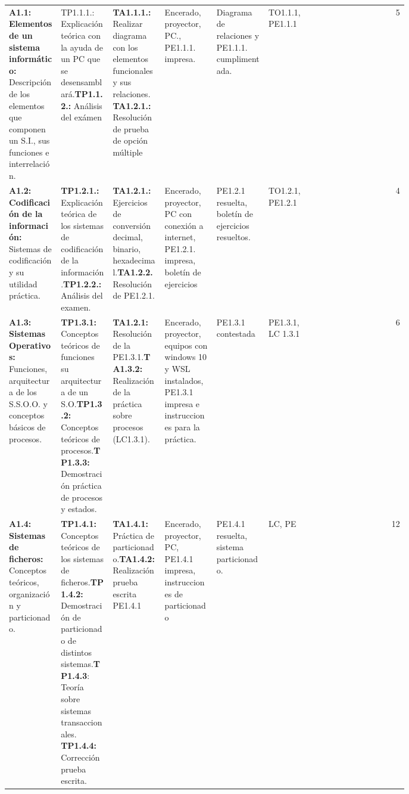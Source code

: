 \begin{landscape}
\begin{tabularx}{\linewidth}{p{0.13\linewidth} p{0.13\linewidth} p{0.13\linewidth} p{0.13\linewidth} p{0.13\linewidth} p{0.13\linewidth} r}
        \textbf{A1.1: Elementos de un sistema informático:} Descripción de los elementos que componen un S.I., sus funciones e interrelación. & TP1.1.1.: Explicación teórica con la ayuda de un PC que se desensamblará.\newline \textbf{TP1.1.2.:} Análisis del exámen & \textbf{TA1.1.1.:} Realizar diagrama con los elementos funcionales y sus relaciones.\newline \textbf{TA1.2.1.:} Resolución de prueba de opción múltiple & Encerado, proyector, PC., PE1.1.1. impresa. & Diagrama de relaciones y PE1.1.1. cumplimentada. & TO1.1.1, PE1.1.1 & 5 \\
        \textbf{A1.2: Codificación de la información:} Sistemas de codificación y su utilidad práctica. & \textbf{TP1.2.1.:} Explicación teórica de los sistemas de codificación de la información.\newline \textbf{TP1.2.2.:} Análisis del examen. & \textbf{TA1.2.1.:} Ejercicios de conversión decimal, binario, hexadecimal.\newline \textbf{TA1.2.2.} Resolución de PE1.2.1.& Encerado, proyector, PC con conexión a internet, PE1.2.1. impresa, boletín de ejercicios & PE1.2.1 resuelta, boletín de ejercicios resueltos. & TO1.2.1, PE1.2.1 & 4 \\
        \textbf{A1.3: Sistemas Operativos:} Funciones, arquitectura de los S.S.O.O. y conceptos básicos de procesos. & \textbf{TP1.3.1:} Conceptos teóricos de funciones su arquitectura de un S.O.\newline \textbf{TP1.3.2:} Conceptos teóricos de procesos.\newline \textbf{TP1.3.3:} Demostración práctica de procesos y estados. & \textbf{TA1.2.1:} Resolución de la PE1.3.1.\newline \textbf{TA1.3.2:} Realización de la práctica sobre procesos (LC1.3.1). & Encerado, proyector, equipos con windows 10 y WSL instalados, PE1.3.1 impresa e instrucciones para la práctica. & PE1.3.1 contestada & PE1.3.1, LC 1.3.1 & 6 \\
        \textbf{A1.4: Sistemas de ficheros:} Conceptos teóricos, organización y particionado. & \textbf{TP1.4.1:} Conceptos teóricos de los sistemas de ficheros.\newline \textbf{TP1.4.2:} Demostración de particionado de distintos sistemas.\newline \textbf{TP1.4.3}: Teoría sobre sistemas transaccionales. \newline \textbf{TP1.4.4:} Corrección prueba escrita. & \textbf{TA1.4.1:} Práctica de particionado.\newline \textbf{TA1.4.2:} Realización prueba escrita PE1.4.1 & Encerado, proyector, PC, PE1.4.1 impresa, instrucciones de particionado & PE1.4.1 resuelta, sistema particionado. & LC, PE & 12 \\

 
        
\end{tabularx}
\egroup
\end{landscape}